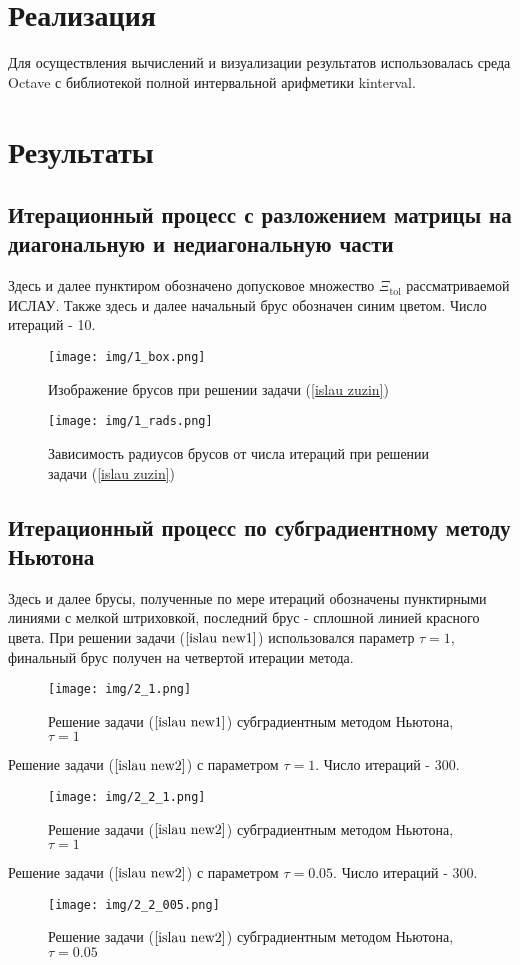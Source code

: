 \documentclass[a4paper]{article}
\begin{document}
\section{Реализация}
Для осуществления вычислений и визуализации результатов использовалась среда Octave с библиотекой полной интервальной арифметики kinterval. 
\section{Результаты}
\subsection{Итерационный процесс с разложением матрицы на диагональную и недиагональную части}
Здесь и далее пунктиром обозначено допусковое множество $\Xi_{\mathrm{tol}}$ рассматриваемой ИСЛАУ. Также здесь и далее начальный брус обозначен синим цветом. Число итераций - 10.
\begin{figure}[H]
    \centering
    \texttt{[image: img/1\_box.png]}
    \caption{Изображение брусов при решении задачи (\ref{islau zuzin})}
    \label{fig:box_z}
\end{figure}
\begin{figure}[H]
    \centering
    \texttt{[image: img/1\_rads.png]}
    \caption{Зависимость радиусов брусов от числа итераций при решении задачи (\ref{islau zuzin})}
    \label{fig:rad_z}
\end{figure}
\subsection{Итерационный процесс по субградиентному методу Ньютона}
Здесь и далее брусы, полученные по мере итераций обозначены пунктирными линиями с мелкой штриховкой, последний брус - сплошной линией красного цвета. При решении задачи ($\ref{islau new1}$) использовался параметр $\tau=1$, финальный брус получен на четвертой итерации метода. 
\begin{figure}[H]
    \centering
    \texttt{[image: img/2\_1.png]}
    \caption{Решение задачи ($\ref{islau new1}$) субградиентным методом Ньютона, $\tau=1$}
    \label{fig:new_1}
\end{figure}
Решение задачи ($\ref{islau new2}$) с параметром $\tau=1$. Число итераций - 300.
\begin{figure}[H]
    \centering
    \texttt{[image: img/2\_2\_1.png]}
    \caption{Решение задачи ($\ref{islau new2}$) субградиентным методом Ньютона, $\tau=1$}
    \label{fig:new_2_1}
\end{figure}
Решение задачи ($\ref{islau new2}$) с параметром $\tau=0.05$. Число итераций - 300.
\begin{figure}[H]
    \centering
    \texttt{[image: img/2\_2\_005.png]}
    \caption{Решение задачи ($\ref{islau new2}$) субградиентным методом Ньютона, $\tau=0.05$}
    \label{fig:new_2_005}
\end{figure}
\end{document}
